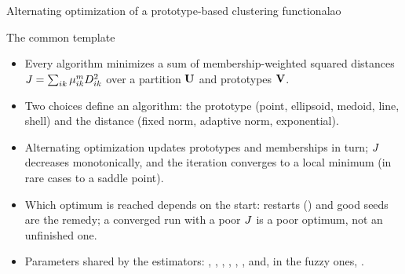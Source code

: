 \begin{algobox}{Alternating optimization of a prototype-based clustering functional}{ao}
\begin{algorithm}[H]
\end{algorithm}
\end{algobox}
\begin{summarybox}{The common template}
\begin{itemize}
  \item Every algorithm minimizes a sum of membership-weighted squared distances $J=\sum_{ik}\mu_{ik}^mD^2_{ik}$ over a partition $\mathbf{U}$ and prototypes $\mathbf{V}$.
  \item Two choices define an algorithm: the prototype (point, ellipsoid, medoid, line, shell) and the distance (fixed norm, adaptive norm, exponential).
  \item Alternating optimization updates prototypes and memberships in turn; $J$ decreases monotonically, and the iteration converges to a local minimum (in rare cases to a saddle point).
  \item Which optimum is reached depends on the start: restarts () and good seeds are the remedy; a converged run with a poor $J$ is a poor optimum, not an unfinished one.
  \item Parameters shared by the estimators: , , , , , , and, in the fuzzy ones, .
\end{itemize}
\end{summarybox}

